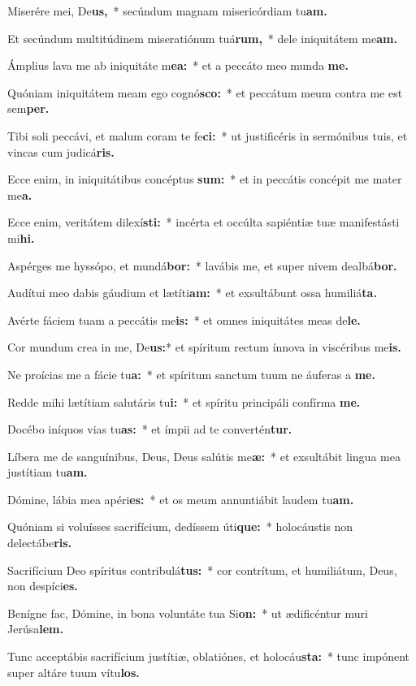 \item Miserére mei, De\textbf{us,}~* secúndum magnam misericórdiam tu\textbf{am.}
\item Et secúndum multitúdinem miseratiónum tuá\textbf{rum,}~* dele iniquitátem me\textbf{am.}
\item Ámplius lava me ab iniquitáte m\textbf{ea:}~* et a peccáto meo munda \textbf{me.}
\item Quóniam iniquitátem meam ego cognó\textbf{sco:}~* et peccátum meum contra me est sem\textbf{per.}
\item Tibi soli peccávi, et malum coram te fe\textbf{ci:}~* ut justificéris in sermónibus tuis, et vincas cum judicá\textbf{ris.}
\item Ecce enim, in iniquitátibus concéptus \textbf{sum:}~* et in peccátis concépit me mater me\textbf{a.}
\item Ecce enim, veritátem dilexí\textbf{sti:}~* incérta et occúlta sapiéntiæ tuæ manifestásti mi\textbf{hi.}
\item Aspérges me hyssópo, et mundá\textbf{bor:}~* lavábis me, et super nivem dealbá\textbf{bor.}
\item Audítui meo dabis gáudium et lætíti\textbf{am:}~* et exsultábunt ossa humiliá\textbf{ta.}
\item Avérte fáciem tuam a peccátis me\textbf{is:}~* et omnes iniquitátes meas de\textbf{le.}
\item Cor mundum crea in me, De\textbf{us:}* et spíritum rectum ínnova in viscéribus me\textbf{is.}
\item Ne proícias me a fácie tu\textbf{a:}~* et spíritum sanctum tuum ne áuferas a \textbf{me.}
\item Redde mihi lætítiam salutáris tu\textbf{i:}~* et spíritu principáli confírma \textbf{me.}
\item Docébo iníquos vias tu\textbf{as:}~* et ímpii ad te convertén\textbf{tur.}
\item Líbera me de sanguínibus, Deus, Deus salútis me\textbf{æ:}~* et exsultábit lingua mea justítiam tu\textbf{am.}
\item Dómine, lábia mea apéri\textbf{es:}~* et os meum annuntiábit laudem tu\textbf{am.}
\item Quóniam si voluísses sacrifícium, dedíssem úti\textbf{que:}~* holocáustis non delectábe\textbf{ris.}
\item Sacrifícium Deo spíritus contribulá\textbf{tus:}~* cor contrítum, et humiliátum, Deus, non despíci\textbf{es.}
\item Benígne fac, Dómine, in bona voluntáte tua Si\textbf{on:}~* ut ædificéntur muri Jerúsa\textbf{lem.}
\item Tunc acceptábis sacrifícium justítiæ, oblatiónes, et holocáu\textbf{sta:}~* tunc impónent super altáre tuum vítu\textbf{los.}